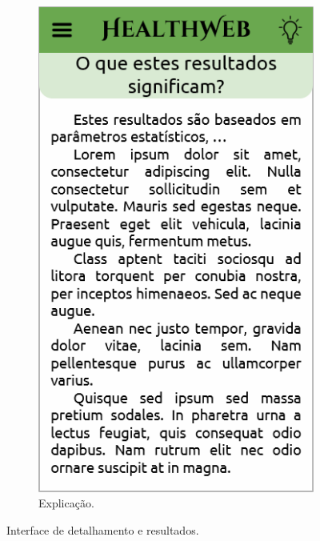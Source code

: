 \begin{figure}[htbp]
\begin{subfigure}{0.24\linewidth}
		\includegraphics[width=\linewidth]{figure/prototype/mobile/meaning.png}
		\caption{Explicação.}
		\label{fig:mobile:meaning}
	\end{subfigure}
	\caption{Interface de detalhamento e resultados.}
	\label{fig:mobile:results_this_disease_disease_page_meaning}
\end{figure}

